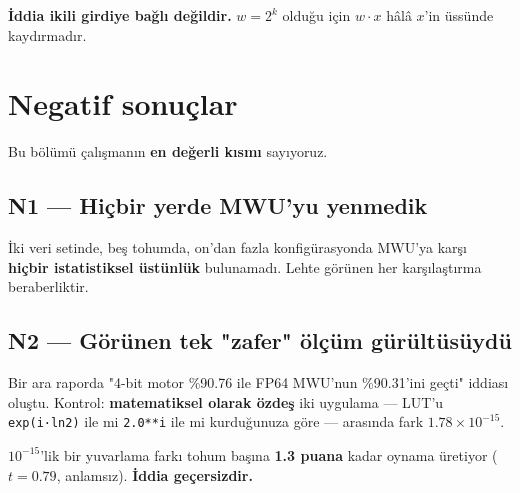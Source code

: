 \documentclass[11pt]{article}
\newenvironment{notkutu}{\def\FrameCommand{\fboxsep=6pt\colorbox{kutu}}\MakeFramed{\advance\hsize-\width\FrameRestore}\small}{\endMakeFramed}
\begin{document}
\begin{center}\small{}\end{center}
\begin{notkutu}\textbf{İddia ikili girdiye bağlı değildir.} $w{=}2^k$ olduğu için $w\cdot x$ hâlâ $x$'in üssünde kaydırmadır.
\end{notkutu}
\section*{Negatif sonuçlar}
\begin{notkutu}Bu bölümü çalışmanın \textbf{en değerli kısmı} sayıyoruz.
\end{notkutu}
\subsection*{N1 — Hiçbir yerde MWU'yu yenmedik}
İki veri setinde, beş tohumda, on'dan fazla konfigürasyonda MWU'ya karşı \textbf{hiçbir istatistiksel üstünlük} bulunamadı. Lehte görünen her karşılaştırma beraberliktir.
\subsection*{N2 — Görünen tek "zafer" ölçüm gürültüsüydü}
Bir ara raporda "4-bit motor \%90.76 ile FP64 MWU'nun \%90.31'ini geçti" iddiası oluştu. Kontrol: \textbf{matematiksel olarak özdeş} iki uygulama — LUT'u \texttt{exp(i·ln2)} ile mi \texttt{2.0**i} ile mi kurduğunuza göre — arasında fark $1.78\times10^{-15}$.
\begin{center}\small{}\end{center}
$10^{-15}$'lik bir yuvarlama farkı tohum başına \textbf{1.3 puana} kadar oynama üretiyor ($t{=}0.79$, anlamsız). \textbf{İddia geçersizdir.}
\end{document}
